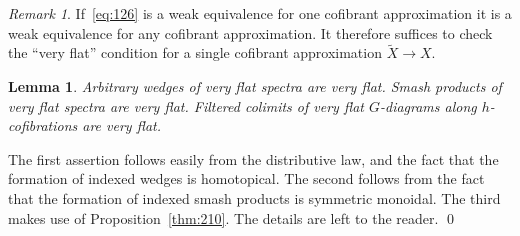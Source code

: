 \documentclass{amsart}
\newtheorem{lem}[equation]{Lemma}
\newtheorem{rem}[equation]{Remark}
\theoremstyle{definition}
\theoremstyle{remark}
\newtheorem{rem}[equation]{Remark}
\newenvironment{pf}{\bigskip{\em Proof:\/}}{\qed\medskip}
\begin{document}
\begin{rem}
\label{rem:16} If~\eqref{eq:126} is a weak equivalence for one
cofibrant approximation it is a weak equivalence for any cofibrant
approximation.  It therefore suffices to check the ``very flat''
condition for a single cofibrant approximation $\tilde X\to X.$
\end{rem}

\begin{lem}
\label{thm:121} Arbitrary wedges of very flat spectra are very flat.
Smash products of very flat spectra are very flat.  Filtered colimits
of very flat $G$-diagrams along $h$-cofibrations are very flat.
\end{lem}

\begin{pf}
The first assertion follows easily from the distributive law, and the
fact that the formation of indexed wedges is homotopical.  The second
follows from the fact that the formation of indexed smash products is
symmetric monoidal.  The third makes use of Proposition~\ref{thm:210}.
The details are left to the reader.
\end{pf}
\end{document}
